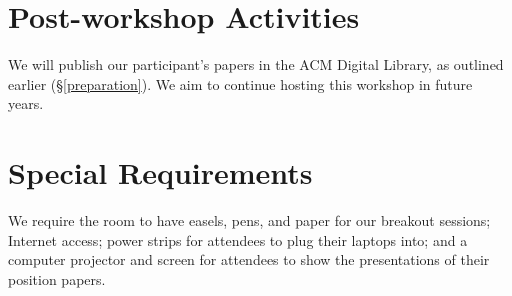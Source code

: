 \documentclass{sigplanconf}
\begin{document}
\section{Post-workshop Activities}

We will publish our participant's papers in the ACM Digital Library, as outlined earlier (\S \ref{preparation}). We aim to continue hosting this workshop in future years.

\section{Special Requirements}

We require the room to have easels, pens, and paper for our breakout sessions; 
Internet access; power strips for attendees to plug their laptops into; and a computer projector and
screen for attendees to show the presentations of their position
papers.
\end{document}
